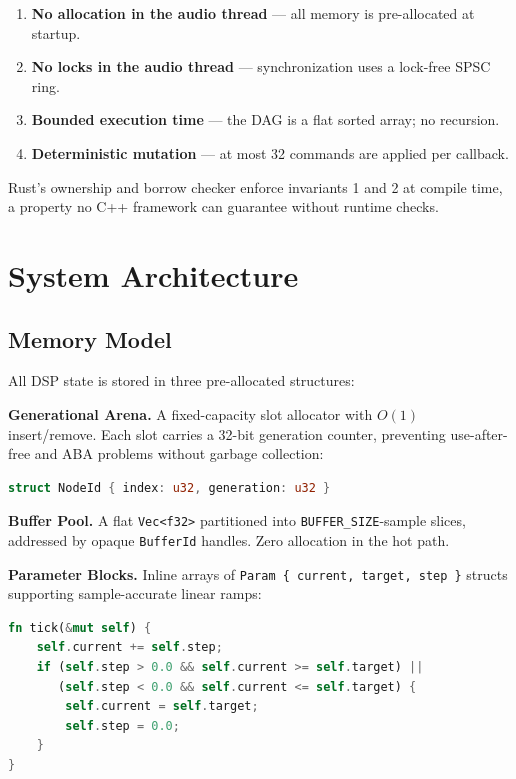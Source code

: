 \documentclass[conference]{IEEEtran}
\begin{document}
\begin{enumerate}
  \item \textbf{No allocation in the audio thread} — all memory is pre-allocated
    at startup.
  \item \textbf{No locks in the audio thread} — synchronization uses a lock-free
    SPSC ring.
  \item \textbf{Bounded execution time} — the DAG is a flat sorted array; no
    recursion.
  \item \textbf{Deterministic mutation} — at most 32 commands are applied per
    callback.
\end{enumerate}

Rust's ownership and borrow checker enforce invariants 1 and 2 at compile time,
a property no C++ framework can guarantee without runtime checks.

\section{System Architecture}

\subsection{Memory Model}

All DSP state is stored in three pre-allocated structures:

\textbf{Generational Arena.} A fixed-capacity slot allocator with $O(1)$
insert/remove. Each slot carries a 32-bit generation counter, preventing
use-after-free and ABA problems without garbage collection:

\begin{lstlisting}[language=Rust]
struct NodeId { index: u32, generation: u32 }
\end{lstlisting}

\textbf{Buffer Pool.} A flat \texttt{Vec<f32>} partitioned into
\texttt{BUFFER\_SIZE}-sample slices, addressed by opaque \texttt{BufferId}
handles. Zero allocation in the hot path.

\textbf{Parameter Blocks.} Inline arrays of \texttt{Param \{ current, target,
step \}} structs supporting sample-accurate linear ramps:

\begin{lstlisting}[language=Rust]
fn tick(&mut self) {
    self.current += self.step;
    if (self.step > 0.0 && self.current >= self.target) ||
       (self.step < 0.0 && self.current <= self.target) {
        self.current = self.target;
        self.step = 0.0;
    }
}
\end{lstlisting}
\end{document}
